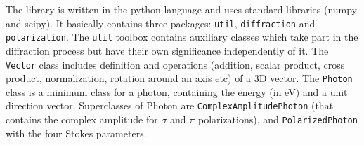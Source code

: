 \documentclass[preprint]{iucr}              %
\begin{document}
The {\tt \crystalpy} library is written in the python language and uses standard libraries (numpy and scipy).
It basically contains three
packages: {\tt util}, {\tt diffraction} and {\tt polarization}.
The {\tt util} toolbox contains auxiliary classes which take part in the diffraction
process but have their own significance independently of it.
 The {\tt Vector} class includes definition and operations (addition, scalar product, cross product, normalization, rotation around
an axis etc) of a 3D vector. 
The {\tt Photon} class is a minimum class for a photon, containing the energy (in eV) and a unit direction vector. Superclasses of Photon are {\tt ComplexAmplitudePhoton} (that contains the complex amplitude for $\sigma$ and $\pi$ polarizations), and {\tt PolarizedPhoton} with the four Stokes parameters.
\end{document}
